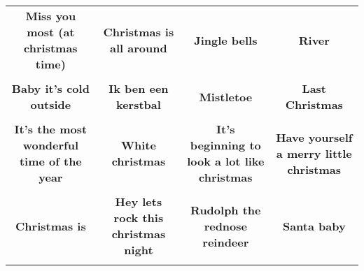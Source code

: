 \documentclass[12pt]{article} \usepackage{eso-pic, graphicx}
\newcommand{\background}[1]{%
\AddToShipoutPictureBG*{\texttt{[image: \#1]}}
}
\begin{document}
\tabcolsep=30.2pt \renewcommand{\arraystretch}{4.5}   \vspace*{4.3cm} \begin{center}  \begin{tabular}{c c c c}
\parbox{3cm}{\centering \textbf{Miss you most (at christmas time)}}& 
\parbox{3cm}{\centering \textbf{Christmas is all around}}& 
\parbox{3cm}{\centering \textbf{Jingle bells}}& 
\parbox{3cm}{\centering \textbf{River}}\\ \\ 
\parbox{3cm}{\centering \textbf{Baby it’s cold outside}}& 
\parbox{3cm}{\centering \textbf{Ik ben een kerstbal}}& 
\parbox{3cm}{\centering \textbf{Mistletoe}}& 
\parbox{3cm}{\centering \textbf{Last Christmas}}\\ \\ 
\parbox{3cm}{\centering \textbf{It’s the most wonderful time of the year}}& 
\parbox{3cm}{\centering \textbf{White christmas}}& 
\parbox{3cm}{\centering \textbf{It’s beginning to look a lot like christmas}}& 
\parbox{3cm}{\centering \textbf{Have yourself a merry little christmas}}\\ \\ 
\parbox{3cm}{\centering \textbf{Christmas is}}& 
\parbox{3cm}{\centering \textbf{Hey lets rock this christmas night}}& 
\parbox{3cm}{\centering \textbf{Rudolph the rednose reindeer}}& 
\parbox{3cm}{\centering \textbf{Santa baby}}\\ \\ 
\end{tabular} \background{discobingo.pdf} \end{center} 
\end{document}
